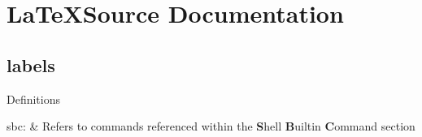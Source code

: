 
\section{\LaTeX Source Documentation}
\subsection{labels}
Definitions
\begin{longtable}
sbc: &
Refers to commands referenced within the \textbf{S}hell \textbf{B}uiltin \textbf{C}ommand section\\
\end{longtable}